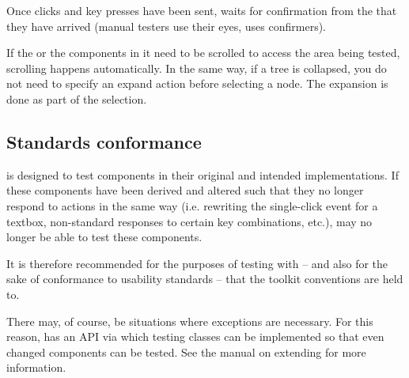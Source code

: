 
Once clicks and key presses have been sent, \app{} waits for confirmation from the \gdaut{} that they have arrived (manual testers use their eyes, \app{} uses confirmers). 

If the \gdaut{} or the components in it need to be scrolled to access the area being tested, scrolling happens automatically. In the same way, if a tree is collapsed, you do not need to specify an expand action before selecting a node. The expansion is done as part of the selection. 


\subsection{Standards conformance}
\app{} is designed to test components in their original
and intended implementations. If these components have been
derived and altered such that they no longer respond to actions in the
same way (i.e. rewriting the single-click event for a textbox,
non-standard responses to certain key combinations, etc.), \app{} may no longer be
able to test these components.

It is therefore recommended for the purposes of testing with \app{} --
and also for the sake of conformance to usability standards -- that
the toolkit conventions are held to.

There may, of course, be situations where exceptions are necessary. For this reason, \app{} has an API via which testing classes can be implemented so that even changed components can be tested. See the manual on extending \app{} for more information. 
